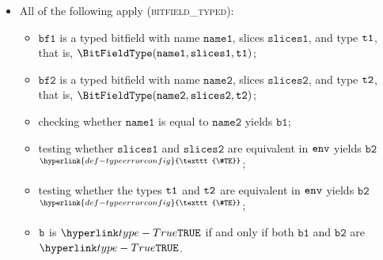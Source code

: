 \documentclass{book}
\newcommand\TypeErrorConfig[0]{\hyperlink{def-typeerrorconfig}{\texttt{\#TE}}}
\newcommand\ProseOrTypeError[0]{\hyperlink{def-proseortypeerror}{$^{\TypeErrorConfig}$}}
\newcommand\bfone[0]{\texttt{bf1}}
\newcommand\bftwo[0]{\texttt{bf2}}
\newcommand\vbone[0]{\texttt{b1}}
\newcommand\vbtwo[0]{\texttt{b2}}
\newcommand\nameone[0]{\texttt{name1}}
\newcommand\nametwo[0]{\texttt{name2}}
\newcommand\slicesone[0]{\texttt{slices1}}
\newcommand\slicestwo[0]{\texttt{slices2}}
\begin{document}
\begin{itemize}
  \item All of the following apply (\textsc{bitfield\_typed}):
  \begin{itemize}
    \item $\bfone$ is a typed bitfield with name $\nameone$, slices $\slicesone$, and type $\texttt{t1}$, that is,
          $\BitFieldType(\nameone, \slicesone, \vtone)$;
    \item $\bftwo$ is a typed bitfield with name $\nametwo$, slices $\slicestwo$, and type $\texttt{t2}$, that is,
          $\BitFieldType(\nametwo, \slicestwo, \vttwo)$;
    \item checking whether $\nameone$ is equal to $\nametwo$ yields $\vbone$;
    \item testing whether $\slicesone$ and $\slicestwo$ are equivalent in $\texttt{env}$ yields $\vbtwo$ \ProseOrTypeError;
    \item testing whether the types $\texttt{t1}$ and $\texttt{t2}$ are equivalent in $\texttt{env}$ yields $\vbtwo$ \ProseOrTypeError;
    \item $\texttt{b}$ is $\True$ if and only if both $\vbone$ and $\vbtwo$ are $\True$.
  \end{itemize}
\end{itemize}
\end{document}

